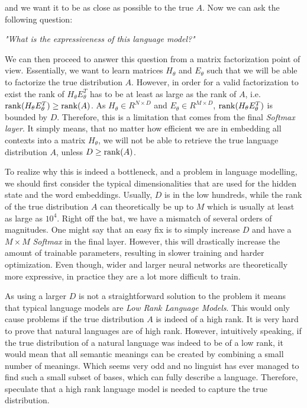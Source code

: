 and we want it to be as close as possible to the true $ A $. Now we can ask the following question:

\begin{center}
    \emph{"What is the expressiveness of this language model?"}
\end{center}

We can then proceed to answer this question from a matrix factorization point of view. Essentially, we want to learn matrices $ H_\theta $ and $ E_\theta $ such that we will be able to factorize the true distribution $ A $. However, in order for a valid factorization to exist the rank of $ H_\theta E^T_\theta $ has to be at least as large as the rank of $ A $, i.e. $ \operatorname{rank}(H_\theta E^T_\theta ) \geq \operatorname{rank}(A) $. As $ H_\theta \in R^{N \times D} $ and $ E_\theta \in R^{M \times D} $, $ \operatorname{rank}(H_\theta E^T_\theta ) $ is bounded by $ D $. Therefore, this is a limitation that comes from the final \emph{Softmax layer}. It simply means, that no matter how efficient we are in embedding all contexts into a matrix $ H_\theta $, we will not be able to retrieve the true language distribution $ A $, unless $ D \geq \operatorname{rank}(A) $.

To realize why this is indeed a bottleneck, and a problem in language modelling, we should first consider the typical dimensionalities that are used for the hidden state and the word embeddings. Usually, $ D $ is in the low hundreds, while the rank of the true distribution $ A $ can theoretically be up to $ M $ which is usually at least as large as $ 10^4 $. Right off the bat, we have a mismatch of several orders of magnitudes. One might say that an easy fix is to simply increase $ D $ and have a $ M \times M $ \emph{Softmax} in the final layer. However, this will drastically increase the amount of trainable parameters, resulting in slower training and harder optimization. Even though, wider and larger neural networks are theoretically more expressive, in practice they are a lot more difficult to train.

As using a larger $ D $ is not a straightforward solution to the problem it means that typical language models are \emph{Low Rank Language Models}. This would only cause problems if the true distribution $ A $ is indeed of a high rank. It is very hard to prove that natural languages are of high rank. However, intuitively speaking, if the true distribution of a natural language was indeed to be of a low rank, it would mean that all semantic meanings can be created by combining a small number of meanings. Which seems very odd and no linguist has ever managed to find such a small subset of bases, which can fully describe a language. Therefore, \citet{yang2017breaking} speculate that a high rank language model is needed to capture the true distribution.


